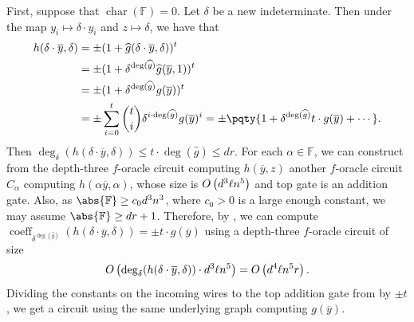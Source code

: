 \documentclass[10pt,a4paper]{amsart}
\DeclareMathOperator{\characteristic}{char}
\DeclareMathOperator{\coeff}{coeff}
\newcommand*\F{\mathbb{F}}
\newcommand*\bigO[1]{%
    O\kern-0.0pt\left(#1\right)
}
\begin{document}
\begin{pf}
    First, suppose that $\characteristic(\F) = 0$.
    Let $\delta$ be a new indeterminate.
    Then under the map $y_i \mapsto \delta \cdot y_i$ and $z \mapsto \delta$, we have that
    \begin{gather}
    \begin{aligned}\label{eq:pfaff_computation_char_0}
        h(\delta \cdot \overline{y}, \delta) &= \pm (1 + \widehat{g}(\delta \cdot \overline{y}, \delta))^t \\
                                             &= \pm (1 + \delta^{\deg(\widehat{g})} \widehat{g}(\overline{y}, 1))^t \\
                                             &= \pm (1 + \delta^{\deg(\widehat{g})} g(\overline{y}))^t \\
                                             &= \pm \sum_{i = 0}^t \binom{t}{i} \delta^{i \cdot \deg(\widehat{g})} g(\overline{y})^i = \pm \pqty{1 + \delta^{\deg(\widehat{g})} t \cdot g(\overline{y}) + \cdots}.
    \end{aligned}
    \end{gather}
    Then $\deg_\delta(h(\delta \cdot \overline{y}, \delta)) \leq t \cdot \deg(\widehat{g}) \leq dr$.
    For each $\alpha\in\F$, we can construct from the depth-three $f$-oracle circuit computing $h(\overline{y},z)$ another $f$-oracle circuit $C_\alpha$ computing $h(\alpha \overline{y}, \alpha)$, whose size is $\bigO{d^3 \ell n^5}$ and top gate is an addition gate.
    Also, as $\abs{\F} \geq c_0 d^3 n^3$, where $c_0>0$ is a large enough constant, we may assume $\abs{\F} \geq dr+1$.
    Therefore, by , we can compute $\coeff_{\delta^{\deg(\widehat{g})}}(h(\delta\cdot \overline{y},\delta))= \pm t \cdot g(\overline{y})$ using a depth-three $f$-oracle circuit of size 
    \[
        \bigO{\deg_\delta(h(\delta \cdot \overline{y}, \delta))\cdot d^3 \ell n^5} = \bigO{d^4 \ell n^5 r}.
    \]
    Dividing the constants on the incoming wires to the top addition gate from  by $\pm t$, we get a circuit using the same underlying graph computing $g(\overline{y})$.


\end{pf}
\end{document}
